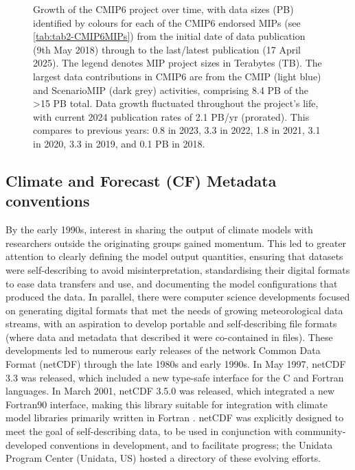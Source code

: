 \documentclass[manuscript]{copernicus}
\def\cred#1{{\color{red}#1}}
\begin{document}
\begin{figure}
    \centering
    
    \caption{Growth of the CMIP6 project over time, with data sizes (PB) identified by colours for each of the CMIP6 endorsed MIPs (see \autoref{tab:tab2-CMIP6MIPs}) from the initial date of data publication (9th May 2018) through to the \cred{last/latest publication (17 April 2025)}. The legend denotes MIP project sizes in Terabytes (TB). The largest data contributions in CMIP6 are from the CMIP (light blue) and ScenarioMIP (dark grey) activities, comprising 8.4 PB of the >15 PB total. Data growth fluctuated throughout the project's life, with \cred{current 2024 publication rates of 2.1 PB/yr (prorated)}. This compares to previous years: 0.8 in 2023, 3.3 in 2022, 1.8 in 2021, 3.1 in 2020, 3.3 in 2019, and 0.1 PB in 2018.}
    \label{fig:fig2-CMIP6DataGrowth}
\end{figure}


\subsection{Climate and Forecast (CF) Metadata conventions}
\label{sec:CFConventions}

By the early 1990s, interest in sharing the output of climate models with researchers outside the originating groups gained momentum. This led to greater attention to clearly defining the model output quantities, ensuring that datasets were self-describing to avoid misinterpretation, standardising their digital formats to ease data transfers and use, and documenting the model configurations that produced the data. In parallel, there were computer science developments focused on generating digital formats that met the needs of growing meteorological data streams, with an aspiration to develop portable and self-describing file formats (where data and metadata that described it were co-contained in files). These developments led to numerous early releases of the network Common Data Format (netCDF) through the late 1980s and early 1990s. In May 1997, netCDF 3.3 was released, which included a new type-safe interface for the C and Fortran languages. In March 2001, netCDF 3.5.0 was released, which integrated a new Fortran90 interface, making this library suitable for integration with climate model libraries primarily written in Fortran \citep{university_corporation_of_atmospheric_research_netcdf_2021}. netCDF was explicitly designed to meet the goal of self-describing data, to be used in conjunction with community-developed conventions in development, and to facilitate progress; the Unidata Program Center (Unidata, US) hosted a directory of these evolving efforts.
\end{document}
